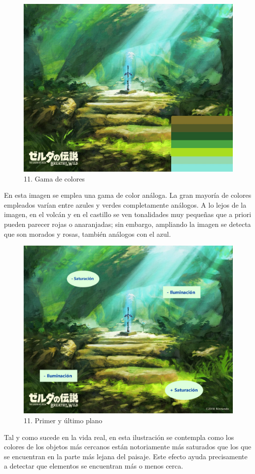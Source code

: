 \documentclass[12pt]{article}
\begin{document}
    \begin{figure}[H]
      \centering
      \includegraphics[scale=0.35]{images/Carlos/12/Gamma.jpg}
      \caption{\small 11. Gama de colores}
    \end{figure}
    En esta imagen se emplea una gama de color análoga. La gran mayoría de colores empleados varían entre azules y verdes completamente análogos. A lo lejos de la imagen, en el volcán y en el castillo se ven tonalidades muy pequeñas que a priori pueden parecer rojas o anaranjadas; sin embargo, ampliando la imagen se detecta que son morados y rosas, también análogos con el azul.

    \begin{figure}[H]
      \centering
      \includegraphics[scale=0.35]{images/Carlos/12/Planos.jpg}
      \caption{\small 11. Primer y último plano}
    \end{figure}
    Tal y como sucede en la vida real, en esta ilustración se contempla como los colores de los objetos más cercanos están notoriamente más saturados que los que se encuentran en la parte más lejana del paisaje. Este efecto ayuda precisamente a detectar que elementos se encuentran más o menos cerca.
\end{document}

